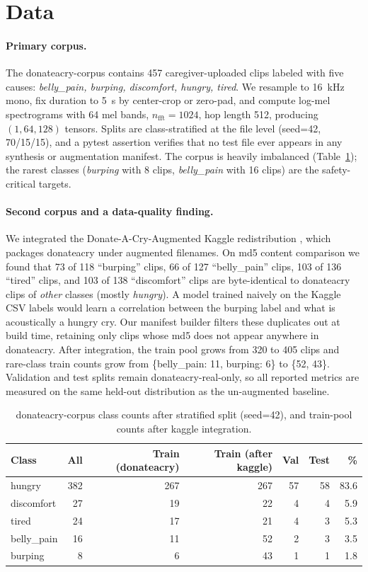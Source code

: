 \documentclass[10pt]{article}
\begin{document}
\section{Data}\label{sec:data}
\paragraph{Primary corpus.} The donateacry-corpus \citep{donateacry} contains 457 caregiver-uploaded clips labeled with five causes: \textit{belly\_pain, burping, discomfort, hungry, tired}. We resample to 16~kHz mono, fix duration to 5~s by center-crop or zero-pad, and compute log-mel spectrograms with 64 mel bands, $n_{\text{fft}}=1024$, hop length 512, producing $(1, 64, 128)$ tensors. Splits are class-stratified at the file level (seed=42, 70/15/15), and a pytest assertion verifies that no test file ever appears in any synthesis or augmentation manifest. The corpus is heavily imbalanced (Table~\ref{tab:counts}); the rarest classes (\textit{burping} with 8 clips, \textit{belly\_pain} with 16 clips) are the safety-critical targets.

\paragraph{Second corpus and a data-quality finding.} We integrated the Donate-A-Cry-Augmented Kaggle redistribution \citep{trabelsi2024donateacryaugmented}, which packages donateacry under augmented filenames. On md5 content comparison we found that 73 of 118 ``burping'' clips, 66 of 127 ``belly\_pain'' clips, 103 of 136 ``tired'' clips, and 103 of 138 ``discomfort'' clips are byte-identical to donateacry clips of \emph{other} classes (mostly \textit{hungry}). A model trained naively on the Kaggle CSV labels would learn a correlation between the burping label and what is acoustically a hungry cry. Our manifest builder filters these duplicates out at build time, retaining only clips whose md5 does not appear anywhere in donateacry. After integration, the train pool grows from 320 to 405 clips and rare-class train counts grow from \{belly\_pain: 11, burping: 6\} to \{52, 43\}. Validation and test splits remain donateacry-real-only, so all reported metrics are measured on the same held-out distribution as the un-augmented baseline.

\begin{table}[H]
\centering
\caption{donateacry-corpus class counts after stratified split (seed=42), and train-pool counts after kaggle integration.}\label{tab:counts}
\begin{tabular}{lrrrrrr}
\toprule
Class & All & Train (donateacry) & Train (after kaggle) & Val & Test & \% \\
\midrule
hungry      & 382 & 267 & 267 & 57 & 58 & 83.6 \\
discomfort  & 27  & 19  & 22  & 4  & 4  & 5.9 \\
tired       & 24  & 17  & 21  & 4  & 3  & 5.3 \\
belly\_pain & 16  & 11  & 52  & 2  & 3  & 3.5 \\
burping     & 8   & 6   & 43  & 1  & 1  & 1.8 \\
\bottomrule
\end{tabular}
\end{table}
\end{document}
